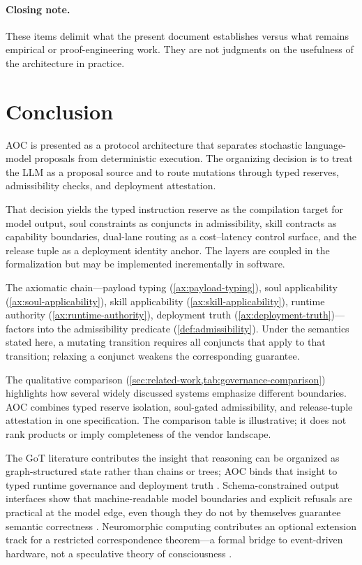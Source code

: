 \documentclass[11pt]{article}
\theoremstyle{remark}
\newcommand{\AOC}{\textup{\textsc{AOC}}}
\begin{document}
\paragraph{Closing note.}
These items delimit what the present document establishes versus what remains empirical or proof-engineering work. They are not judgments on the usefulness of the architecture in practice.

\section{Conclusion}

\AOC{} is presented as a protocol architecture that separates stochastic language-model proposals from deterministic execution. The organizing decision is to treat the LLM as a proposal source and to route mutations through typed reserves, admissibility checks, and deployment attestation.

That decision yields the typed instruction reserve as the compilation target for model output, soul constraints as conjuncts in admissibility, skill contracts as capability boundaries, dual-lane routing as a cost--latency control surface, and the release tuple as a deployment identity anchor. The layers are coupled in the formalization but may be implemented incrementally in software.

The axiomatic chain---payload typing (\cref{ax:payload-typing}), soul applicability (\cref{ax:soul-applicability}), skill applicability (\cref{ax:skill-applicability}), runtime authority (\cref{ax:runtime-authority}), deployment truth (\cref{ax:deployment-truth})---factors into the admissibility predicate (\cref{def:admissibility}). Under the semantics stated here, a mutating transition requires all conjuncts that apply to that transition; relaxing a conjunct weakens the corresponding guarantee.

The qualitative comparison (\cref{sec:related-work,tab:governance-comparison}) highlights how several widely discussed systems emphasize different boundaries. \AOC{} combines typed reserve isolation, soul-gated admissibility, and release-tuple attestation in one specification. The comparison table is illustrative; it does not rank products or imply completeness of the vendor landscape.

The GoT literature contributes the insight that reasoning can be organized as graph-structured state rather than chains or trees; \AOC{} binds that insight to typed runtime governance and deployment truth \cite{besta2024got}. Schema-constrained output interfaces show that machine-readable model boundaries and explicit refusals are practical at the model edge, even though they do not by themselves guarantee semantic correctness \cite{openaistructuredoutputs}. Neuromorphic computing contributes an optional extension track for a restricted correspondence theorem---a formal bridge to event-driven hardware, not a speculative theory of consciousness \cite{merolla2014, ibmtruenorth, intelloihi2, spinnaker}.
\end{document}
